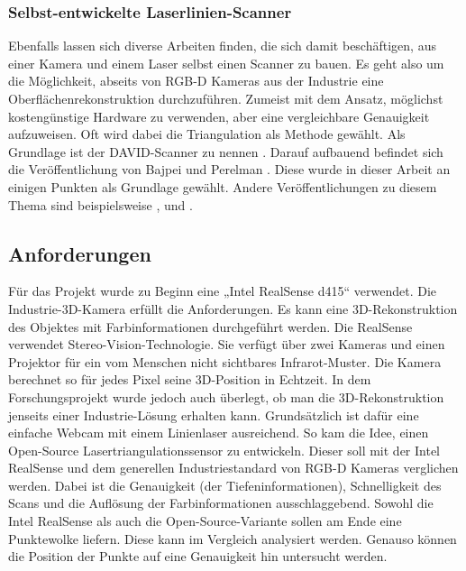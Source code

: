 		\subsubsection{Selbst-entwickelte Laserlinien-Scanner}
		Ebenfalls lassen sich diverse Arbeiten finden, die sich damit beschäftigen, aus einer Kamera und einem Laser selbst einen Scanner zu bauen. Es geht also um die Möglichkeit, abseits von RGB-D Kameras aus der Industrie eine Oberflächenrekonstruktion durchzuführen. Zumeist mit dem Ansatz, möglichst kostengünstige Hardware zu verwenden, aber eine vergleichbare Genauigkeit aufzuweisen. Oft wird dabei die Triangulation als Methode gewählt. Als Grundlage ist der DAVID-Scanner zu nennen \citep[vgl.][]{david_scanner}. Darauf aufbauend befindet sich die Veröffentlichung von Bajpei und Perelman \citep[vgl.][]{baj-per}. Diese wurde in dieser Arbeit an einigen Punkten als Grundlage gewählt. Andere Veröffentlichungen zu diesem Thema sind beispielsweise \cite[vgl.][]{bijman_3d_2017}, \citep[vgl.][]{franca_3d_2005} und \citep[vgl.][]{malhotra_3d_2011}.
			
	\subsection{Anforderungen}
	Für das Projekt wurde zu Beginn eine „Intel RealSense d415“ verwendet. Die Industrie-3D-Kamera erfüllt die Anforderungen. Es kann eine 3D-Rekonstruktion des Objektes mit Farbinformationen durchgeführt werden. Die RealSense verwendet Stereo-Vision-Technologie. Sie verfügt über zwei Kameras und einen Projektor für ein vom Menschen nicht sichtbares Infrarot-Muster. Die Kamera berechnet so für jedes Pixel seine 3D-Position in Echtzeit. In dem Forschungsprojekt wurde jedoch auch überlegt, ob man die 3D-Rekonstruktion jenseits einer Industrie-Lösung erhalten kann. Grundsätzlich ist dafür eine einfache Webcam mit einem Linienlaser ausreichend. So kam die Idee, einen Open-Source Lasertriangulationssensor zu entwickeln.
	Dieser soll mit der Intel RealSense und dem generellen Industriestandard von RGB-D Kameras verglichen werden. Dabei ist die Genauigkeit (der Tiefeninformationen), Schnelligkeit des Scans und die Auflösung der Farbinformationen ausschlaggebend. Sowohl die Intel RealSense als auch die Open-Source-Variante sollen am Ende eine Punktewolke liefern. Diese kann im Vergleich analysiert werden. Genauso können die Position der Punkte auf eine Genauigkeit hin untersucht werden.
	
